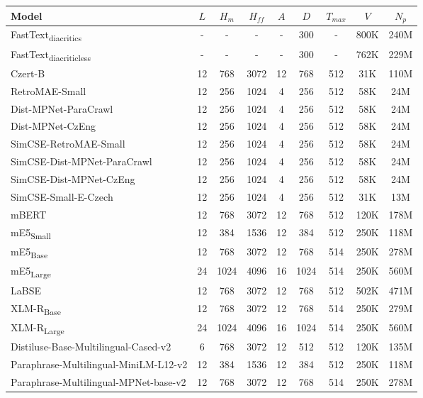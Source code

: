 \begin{table*}[ht!]
    \centering
    \begin{tabular}{lcccccccc}
      \toprule
      \textbf{Model} & $L$ & $H_m$ & $H_{ff}$ & $A$ & $D$ & $T_{max}$ & $V$ & $N_p$ \\
      \midrule
      FastText\textsubscript{diacritics} & - & - & - & - & 300 & - & 800K & 240M \\
      FastText\textsubscript{diacriticless} & - & - & - & - & 300 & - & 762K & 229M \\
      \midrule
      Czert-B & 12 & 768 & 3072 & 12 & 768 & 512 & 31K & 110M \\
      RetroMAE-Small & 12 & 256 & 1024 & 4 & 256 & 512 & 58K & 24M \\
      Dist-MPNet-ParaCrawl & 12 & 256 & 1024 & 4 & 256 & 512 & 58K & 24M \\
      Dist-MPNet-CzEng & 12 & 256 & 1024 & 4 & 256 & 512 & 58K & 24M \\
      SimCSE-RetroMAE-Small & 12 & 256 & 1024 & 4 & 256 & 512 & 58K & 24M \\
      SimCSE-Dist-MPNet-ParaCrawl & 12 & 256 & 1024 & 4 & 256 & 512 & 58K & 24M \\
      SimCSE-Dist-MPNet-CzEng & 12 & 256 & 1024 & 4 & 256 & 512 & 58K & 24M \\
      SimCSE-Small-E-Czech & 12 & 256 & 1024 & 4 & 256 & 512 & 31K & 13M \\
      mBERT & 12 & 768 & 3072 & 12 & 768 & 512 & 120K & 178M \\
      mE5\textsubscript{Small} & 12 & 384 & 1536 & 12 & 384 & 512 & 250K & 118M \\
      mE5\textsubscript{Base} & 12 & 768 & 3072 & 12 & 768 & 514 & 250K & 278M \\
      mE5\textsubscript{Large} & 24 & 1024 & 4096 & 16 & 1024 & 514 & 250K & 560M \\
      LaBSE & 12 & 768 & 3072 & 12 & 768 & 512 & 502K & 471M \\
      XLM-R\textsubscript{Base} & 12 & 768 & 3072 & 12 & 768 & 514 & 250K & 279M \\
      XLM-R\textsubscript{Large} & 24 & 1024 & 4096 & 16 & 1024 & 514 & 250K & 560M \\
      Distiluse-Base-Multilingual-Cased-v2 & 6 & 768 & 3072 & 12 & 512 & 512 & 120K & 135M \\
      Paraphrase-Multilingual-MiniLM-L12-v2 & 12 & 384 & 1536 & 12 & 384 & 512 & 250K & 118M \\
      Paraphrase-Multilingual-MPNet-base-v2 & 12 & 768 & 3072 & 12 & 768 & 514 & 250K & 278M \\

\end{tabular}
\end{table*}
